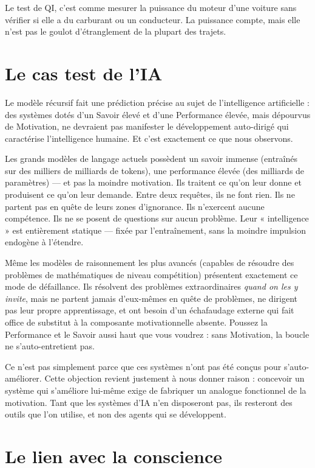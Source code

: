 \documentclass[11pt, twoside, openright]{book}
\begin{document}
Le test de QI, c'est comme mesurer la puissance du moteur d'une voiture sans vérifier si elle a du carburant ou un conducteur. La puissance compte, mais elle n'est pas le goulot d'étranglement de la plupart des trajets.

\section*{Le cas test de l'IA}

Le modèle récursif fait une prédiction précise au sujet de l'intelligence artificielle : des systèmes dotés d'un Savoir élevé et d'une Performance élevée, mais dépourvus de Motivation, ne devraient pas manifester le développement auto-dirigé qui caractérise l'intelligence humaine. Et c'est exactement ce que nous observons.

Les grands modèles de langage actuels possèdent un savoir immense (entraînés sur des milliers de milliards de tokens), une performance élevée (des milliards de paramètres) --- et pas la moindre motivation. Ils traitent ce qu'on leur donne et produisent ce qu'on leur demande. Entre deux requêtes, ils ne font rien. Ils ne partent pas en quête de leurs zones d'ignorance. Ils n'exercent aucune compétence. Ils ne se posent de questions sur aucun problème. Leur « intelligence » est entièrement statique --- fixée par l'entraînement, sans la moindre impulsion endogène à l'étendre.

Même les modèles de raisonnement les plus avancés (capables de résoudre des problèmes de mathématiques de niveau compétition) présentent exactement ce mode de défaillance. Ils résolvent des problèmes extraordinaires \textit{quand on les y invite}, mais ne partent jamais d'eux-mêmes en quête de problèmes, ne dirigent pas leur propre apprentissage, et ont besoin d'un échafaudage externe qui fait office de substitut à la composante motivationnelle absente. Poussez la Performance et le Savoir aussi haut que vous voudrez : sans Motivation, la boucle ne s'auto-entretient pas.

Ce n'est pas simplement parce que ces systèmes n'ont pas été conçus pour s'auto-améliorer. Cette objection revient justement à nous donner raison : concevoir un système qui s'améliore lui-même exige de fabriquer un analogue fonctionnel de la motivation. Tant que les systèmes d'IA n'en disposeront pas, ils resteront des outils que l'on utilise, et non des agents qui se développent.

\section*{Le lien avec la conscience}
\end{document}
